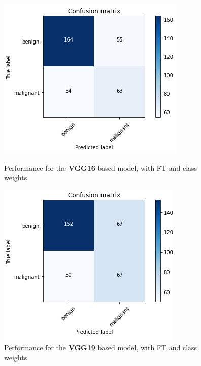 \documentclass[11pt,a4paper,oneside]{article}
\begin{document}
\begin{figure}[h]
	\begin{minipage}[c]{.4\textwidth}
		\centering\setlength{\captionmargin}{0pt}%
		\includegraphics[width=.9\textwidth]{images/Task 3/VGG16 3.2/Conf_Matrix}
		\caption{Performance for the \textbf{VGG16} based model, with FT and class weights}
		\label{fig:vgg16_3.2}
	\end{minipage}
	\hspace{5mm}%
	\begin{minipage}[c]{.4\textwidth}
		\centering\setlength{\captionmargin}{0pt}%
		\includegraphics[width=.9\textwidth]{images/Task 3/VGG19 3.2/Conf_Matrix}
		\caption{Performance for the \textbf{VGG19} based model, with FT and class weights}
		\label{fig:vgg19_3.2}
	\end{minipage}
\end{figure}
\end{document}
